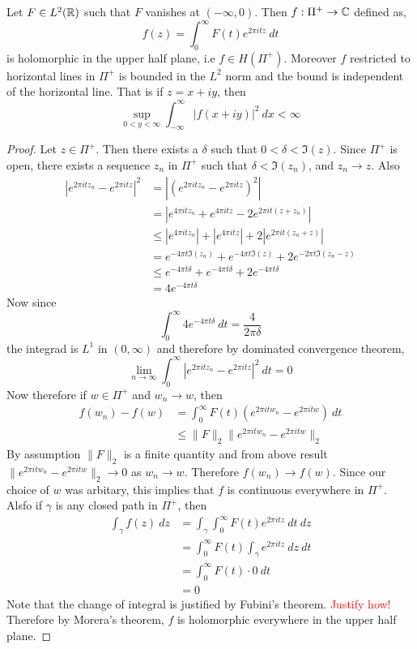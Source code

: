 \begin{proposition}
  Let $F\in L^2(\mathbb R)$ such that $F$ vanishes at $(-\infty , 0)$. Then $f : \Pi^+ \to \mathbb C$ defined as, $$f(z) = \int_0^\infty F(t) e^{2\pi itz} \ dt$$
  is holomorphic in the upper half plane, i.e $f \in H(\Pi^+)$. Moreover $f$ restricted to horizontal lines in $\Pi^+$ is bounded in the  $L^2$ norm and the bound is independent of the horizontal line. That is if $z = x+iy$, then $$\sup_{0<y<\infty}\int_{-\infty}^\infty \left|f(x + iy)\right|^2 \ dx < \infty$$
\end{proposition}
\begin{proof}
  Let $z \in \Pi^+$. Then there exists a $\delta$ such that $0< \delta < \Im(z)$. Since $\Pi^+$ is open, there exists a sequence $z_n$ in $\Pi^+$ such that $\delta < \Im(z_n)$, and  $z_n \to z$. Also 
  \begin{align*}
    \left|e^{2 \pi itz_n} - e^{2\pi itz}\right|^2 &= \left|\left(e^{2\pi it z_n} - e^{2\pi itz}\right)^2\right| \\ 
    &= \left| e^{4\pi itz_n} + e^{4\pi itz} - 2e^{2\pi it(z+z_n)} \right| \\
    &\le \left|e^{4\pi itz_n}\right| + \left|e^{4\pi itz}\right| + 2\left|e^{2\pi it(z_n + z)}\right| \\
    &= e^{-4\pi t \Im(z_n)} + e^{-4 \pi t \Im(z)} + 2e^{-2\pi t \Im(z_n - z)} \\
    &\le e^{-4\pi t \delta} + e^{-4\pi t \delta} + 2e^{-4 \pi t\delta} \\
    &=4e^{-4\pi t \delta}
  \end{align*}
  Now since $$\int_0^\infty 4e^{-4\pi t\delta} \ dt = \frac{4}{2\pi \delta}$$
  the integrad is $L^1$ in $(0, \infty)$ and therefore by dominated convergence theorem, $$\lim_{n \to \infty} \int_0^\infty \left|e^{2\pi itz_n} - e^{2\pi itz}\right|^2 \ dt = 0$$
  Now therefore if $w \in \Pi^+$ and $w_n \to w$, then 
  \begin{align*}
    f(w_n) - f(w) &= \int_0^\infty F(t)(e^{2\pi it w_n} - e^{2\pi i tw}) \ dt \\
    & \le \|F\|_2 \|e^{2\pi itw_n} - e^{2\pi itw}\|_2
  \end{align*}
  By assumption $\|F\|_2$ is a finite quantity and from above result $\|e^{2\pi itw_n} - e^{2\pi itw}\|_2 \to 0$ as $w_n \to w$. Therefore $f(w_n) \to f(w)$. Since our choice of $w$ was arbitary, this implies that $f$ is continuous everywhere in $\Pi^+$. Alsfo if $\gamma$ is any closed path in $\Pi^+$, then 
  \begin{align*}
    \int_\gamma f(z)\ dz &= \int_\gamma \int_0^\infty F(t) e^{2\pi i t z} \ dt \ dz \\
    & = \int_0^\infty F(t) \int_\gamma e^{2\pi itz} \ dz \ dt \\
    & = \int_0^\infty F(t) \cdot 0 \ dt \\
    & = 0
  \end{align*}
  Note that the change of integral is justified by Fubini's theorem. \textcolor{red}{Justify how!} Therefore by Morera's theorem, $f$ is holomorphic everywhere in the upper half plane.  


\end{proof}

